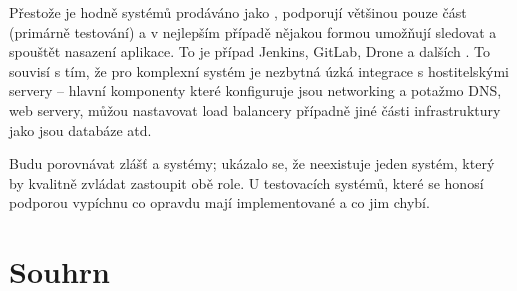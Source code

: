     Přestože je hodně systémů prodáváno jako \CICD, podporují většinou pouze \CI část (primárně testování) a v nejlepším případě nějakou formou umožňují sledovat a spouštět nasazení aplikace. To je případ Jenkins, GitLab, Drone a dalších \cite{ellingwood-cicd-list}. To souvisí s tím, že pro komplexní \CD systém je nezbytná úzká integrace s hostitelskými servery -- hlavní komponenty které \CD konfiguruje jsou networking a potažmo DNS, \HTTP web servery, můžou nastavovat load balancery případně jiné části infrastruktury jako jsou databáze atd.

    Budu porovnávat zlášť \CI a \CD systémy; ukázalo se, že neexistuje jeden systém, který by kvalitně zvládat zastoupit obě role. U testovacích systémů, které se honosí podporou \CD vypíchnu co opravdu mají implementované a co jim chybí.

    \blind[1]

    

    

    

    

    

    

    


    

    \section{Souhrn}
